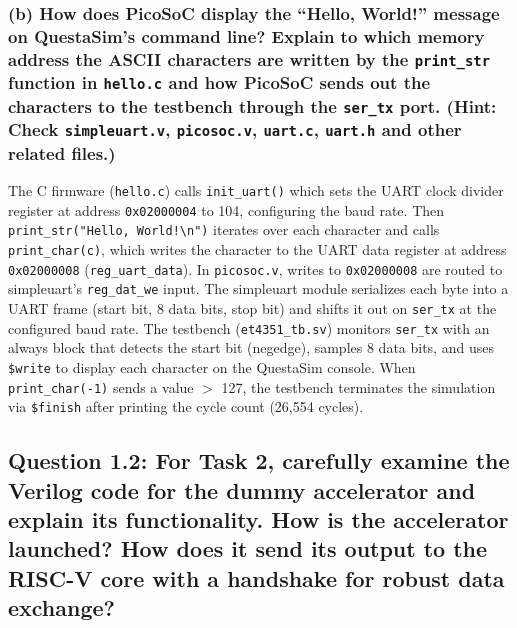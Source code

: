 \documentclass{article}
\begin{document}
\subsubsection*{(b) How does PicoSoC display the ``Hello, World!'' message on QuestaSim's command line? Explain to which memory address the ASCII characters are written by the \texttt{print\_str} function in \texttt{hello.c} and how PicoSoC sends out the characters to the testbench through the \texttt{ser\_tx} port. (Hint: Check \texttt{simpleuart.v}, \texttt{picosoc.v}, \texttt{uart.c}, \texttt{uart.h} and other related files.)}

\begin{tcolorbox}[colback=white, colframe=black, width=\textwidth, title=Answer 1.1(b)]

The C firmware (\texttt{hello.c}) calls \texttt{init\_uart()} which sets the UART clock divider register at address \texttt{0x02000004} to 104, configuring the baud rate. Then \texttt{print\_str("Hello, World!\textbackslash n")} iterates over each character and calls \texttt{print\_char(c)}, which writes the character to the UART data register at address \texttt{0x02000008} (\texttt{reg\_uart\_data}). In \texttt{picosoc.v}, writes to \texttt{0x02000008} are routed to simpleuart's \texttt{reg\_dat\_we} input. The simpleuart module serializes each byte into a UART frame (start bit, 8 data bits, stop bit) and shifts it out on \texttt{ser\_tx} at the configured baud rate. The testbench (\texttt{et4351\_tb.sv}) monitors \texttt{ser\_tx} with an always block that detects the start bit (negedge), samples 8 data bits, and uses \texttt{\$write} to display each character on the QuestaSim console. When \texttt{print\_char(-1)} sends a value $>$ 127, the testbench terminates the simulation via \texttt{\$finish} after printing the cycle count (26{,}554 cycles).

\end{tcolorbox}

\newpage
\subsection*{Question 1.2: For Task 2, carefully examine the Verilog code for the dummy accelerator and explain its functionality. How is the accelerator launched? How does it send its output to the RISC-V core with a handshake for robust data exchange?}
\end{document}
